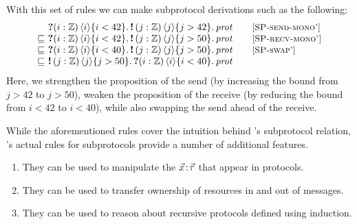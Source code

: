 With this set of rules we can make subprotocol derivations such as the following:
%
\[
\begin{array}{@{} l @{\ } l @{\qquad } l @{}}
    &\recvprot{(i:\integer)}{i}{i < 42}
      \sendprot{(j:\integer)}{j}{j > 42}
      \prot & \ruleref{SP-send-mono'}\\
    \subprotop
    &\recvprot{(i:\integer)}{i}{i < 42}
      \sendprot{(j:\integer)}{j}{j > 50}
      \prot & \ruleref{SP-recv-mono'} \\
    \subprotop
    &\recvprot{(i:\integer)}{i}{i < 40}
      \sendprot{(j:\integer)}{j}{j > 50}
      \prot & \ruleref{SP-swap'} \\
    \subprotop
    & \sendprot{(j:\integer)}{j}{j > 50}
      \recvprot{(i:\integer)}{i}{i < 40}
      \prot &
\end{array}
\]
%
Here, we strengthen the proposition of the send (by increasing the bound
from $j > 42$ to $j > 50$), weaken the proposition of the receive
(by reducing the bound from $i < 42$ to $i < 40$), while also swapping the send ahead of the receive.

While the aforementioned rules cover the intuition behind \lname's subprotocol
relation, \lname's actual rules for subprotocols provide a number of additional features.

\begin{enumerate}
\item They can be used to manipulate the \binders $\vec{x}\!:\!\vec{\tau}$ that appear in protocols.
\item They can be used to transfer ownership of resources in and out of messages.
\item They can be used to reason about recursive protocols defined using
   induction.
\end{enumerate}

\subprotfig

